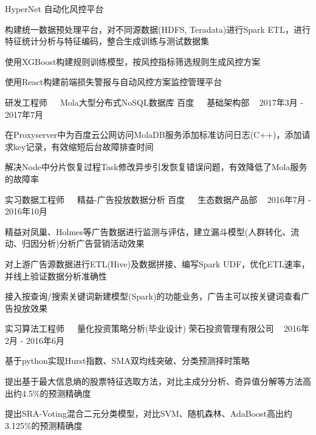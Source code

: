 \documentclass[11pt, a4paper, UTF8]{awesome-cv}
\begin{document}
\begin{cventries}
  \cventry
    {HyperNet 自动化风控平台} %
    {} %
    {} %
    {\ } %
    {
      \begin{cvitems} %
        \item {构建统一数据预处理平台，对不同源数据(HDFS, Teradata)进行Spark ETL，进行特征统计分析与特征编码，整合生成训练与测试数据集}
        \item {使用XGBoost构建规则训练模型，按风控指标筛选规则生成风控方案}
        \item {使用React构建前端损失警报与自动风控方案监控管理平台}
      \end{cvitems}
    }
    
  \cventry
    {研发工程师{\ \cdotp\ \ }Mola大型分布式NoSQL数据库} %
    {百度{\ \cdotp\ \ }基础架构部} %
    {\ } %
    {2017年3月 - 2017年7月} %
    {
      \begin{cvitems} %
        \item {在Proxyserver中为百度云公网访问MolaDB服务添加标准访问日志(C++)，添加请求key记录，有效缩短后台故障排查时间}
        \item {解决Node中分片恢复过程Task修改异步引发恢复错误问题，有效降低了Mola服务的故障率}
      \end{cvitems}
    }

  \cventry
    {实习数据工程师{\ \cdotp\ \ }精益-广告投放数据分析} %
    {百度{\ \cdotp\ \ }生态数据产品部} %
    {\ } %
    {2016年7月 - 2016年10月} %
    {
      \begin{cvitems} %
        \item {精益对凤巢、Holmes等广告数据进行监测与评估，建立漏斗模型(人群转化、流动、归因分析)分析广告营销活动效果}
        \item {对上游广告源数据进行ETL(Hive)及数据拼接、编写Spark UDF，优化ETL速率，并线上验证数据分析准确性}
        \item {接入按查询/搜索关键词新建模型(Spark)的功能业务，广告主可以按关键词查看广告投放效果}
      \end{cvitems}
    }
        
  \cventry
    {实习算法工程师{\ \cdotp\ \ }量化投资策略分析(毕业设计)} %
    {荣石投资管理有限公司} %
    {\ } %
    {2016年2月 - 2016年6月} %
    {
      \begin{cvitems} %
        \item {基于python实现Hurst指数、SMA双均线突破、分类预测择时策略}
        \item {提出基于最大信息熵的股票特征选取方法，对比主成分分析、奇异值分解等方法高出约4.5\%的预测精确度}
        \item {提出SRA-Voting混合二元分类模型，对比SVM、随机森林、AdaBoost高出约3.125\%的预测精确度}
      \end{cvitems}
    }
    

\end{cventries}
\end{document}
